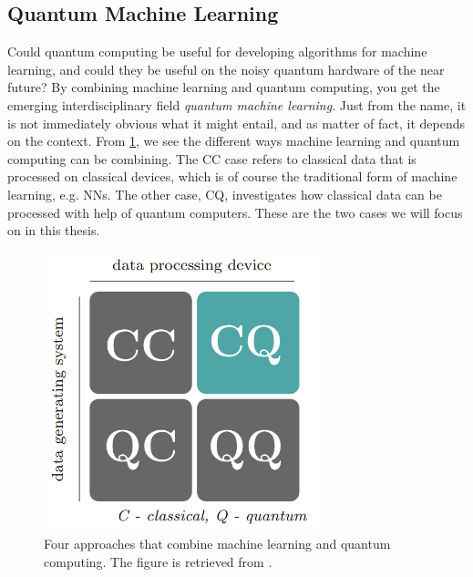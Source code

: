 \subsection{Quantum Machine Learning}\label{sec:Quantum Machine Learning}
Could quantum computing be useful for developing algorithms for machine learning, and could they be useful on the noisy quantum hardware of the near future? By combining machine learning and quantum computing, you get the emerging interdisciplinary field \emph{quantum machine learning}. Just from the name, it is not immediately obvious what it might entail, and as matter of fact, it depends on the context. From \cref{fig:cccq}, we see the different ways machine learning and quantum computing can be combining. The CC case refers to classical data that is processed on classical devices, which is of course the traditional form of machine learning, e.g. NNs. The other case, CQ, investigates how classical data can be processed with help of quantum computers. These are the two cases we will focus on in this thesis.

\begin{figure}[htp]
    \centering
    \includegraphics[width=8cm]{latex/figures/cccq.PNG}
    \caption{Four approaches that combine machine learning and quantum computing. The figure is retrieved from \citet{SupervisedwquantumComputers}.}
    \label{fig:cccq}
\end{figure}

